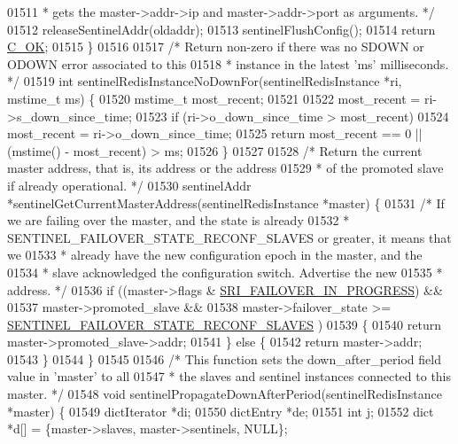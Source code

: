 \begin{DoxyCode}
{{{{{{{{{{{{{{{{{{01511 \textcolor{comment}{     * gets the master->addr->ip and master->addr->port as arguments. */}
01512     releaseSentinelAddr(oldaddr);
01513     sentinelFlushConfig();
01514     \textcolor{keywordflow}{return} \hyperlink{server_8h_a303769ef1065076e68731584e758d3e1}{C\_OK};
01515 \}
01516 
01517 \textcolor{comment}{/* Return non-zero if there was no SDOWN or ODOWN error associated to this}
01518 \textcolor{comment}{ * instance in the latest 'ms' milliseconds. */}
01519 \textcolor{keywordtype}{int} sentinelRedisInstanceNoDownFor(sentinelRedisInstance *ri, mstime\_t ms) \{
01520     mstime\_t most\_recent;
01521 
01522     most\_recent = ri->s\_down\_since\_time;
01523     \textcolor{keywordflow}{if} (ri->o\_down\_since\_time > most\_recent)
01524         most\_recent = ri->o\_down\_since\_time;
01525     \textcolor{keywordflow}{return} most\_recent == 0 || (mstime() - most\_recent) > ms;
01526 \}
01527 
01528 \textcolor{comment}{/* Return the current master address, that is, its address or the address}
01529 \textcolor{comment}{ * of the promoted slave if already operational. */}
01530 sentinelAddr *sentinelGetCurrentMasterAddress(sentinelRedisInstance *master) \{
01531     \textcolor{comment}{/* If we are failing over the master, and the state is already}
01532 \textcolor{comment}{     * SENTINEL\_FAILOVER\_STATE\_RECONF\_SLAVES or greater, it means that we}
01533 \textcolor{comment}{     * already have the new configuration epoch in the master, and the}
01534 \textcolor{comment}{     * slave acknowledged the configuration switch. Advertise the new}
01535 \textcolor{comment}{     * address. */}
01536     \textcolor{keywordflow}{if} ((master->flags & \hyperlink{sentinel_8c_a0546b63633196f09fcd90957243b0798}{SRI\_FAILOVER\_IN\_PROGRESS}) &&
01537         master->promoted\_slave &&
01538         master->failover\_state >= \hyperlink{sentinel_8c_a05b020edfa71eb4d24288e79637b57f5}{SENTINEL\_FAILOVER\_STATE\_RECONF\_SLAVES}
      )
01539     \{
01540         \textcolor{keywordflow}{return} master->promoted\_slave->addr;
01541     \} \textcolor{keywordflow}{else} \{
01542         \textcolor{keywordflow}{return} master->addr;
01543     \}
01544 \}
01545 
01546 \textcolor{comment}{/* This function sets the down\_after\_period field value in 'master' to all}
01547 \textcolor{comment}{ * the slaves and sentinel instances connected to this master. */}
01548 \textcolor{keywordtype}{void} sentinelPropagateDownAfterPeriod(sentinelRedisInstance *master) \{
01549     dictIterator *di;
01550     dictEntry *de;
01551     \textcolor{keywordtype}{int} j;
01552     dict *d[] = \{master->slaves, master->sentinels, NULL\};
}}}}}}}}}}}}}}}}}}
\end{DoxyCode}
